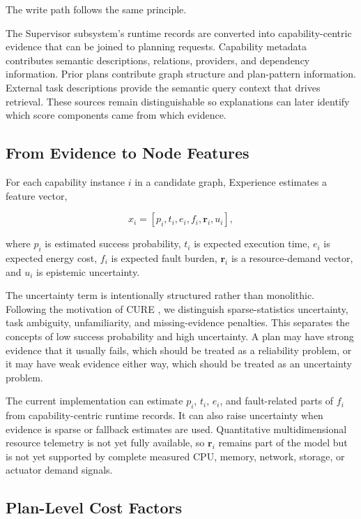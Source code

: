 \documentclass[letterpaper, 10pt, conference]{ieeeconf}
\begin{document}
The write path follows the same principle. 

The Supervisor subsystem's runtime records are converted into capability-centric evidence that can be joined to planning requests. Capability metadata contributes semantic descriptions, relations, providers, and dependency information. Prior plans contribute graph structure and plan-pattern information. External task descriptions provide the semantic query context that drives retrieval. These sources remain distinguishable so explanations can later identify which score components came from which evidence.

\subsection{From Evidence to Node Features}

For each capability instance $i$ in a candidate graph, Experience estimates a feature vector,

\begin{equation}
x_i = [p_i, t_i, e_i, f_i, \mathbf{r}_i, u_i],
\end{equation}

where $p_i$ is estimated success probability, $t_i$ is expected execution time, $e_i$ is expected energy cost, $f_i$ is expected fault burden, $\mathbf{r}_i$ is a resource-demand vector, and $u_i$ is epistemic uncertainty.

The uncertainty term is intentionally structured rather than monolithic. Following the motivation of CURE \cite{yin2025reliablellmbasedrobotplanning}, we distinguish sparse-statistics uncertainty, task ambiguity, unfamiliarity, and missing-evidence penalties. This separates the concepts of low success probability and high uncertainty. A plan may have strong evidence that it usually fails, which should be treated as a reliability problem, or it may have weak evidence either way, which should be treated as an uncertainty problem.

The current implementation can estimate $p_i$, $t_i$, $e_i$, and fault-related parts of $f_i$ from capability-centric runtime records. It can also raise uncertainty when evidence is sparse or fallback estimates are used. Quantitative multidimensional resource telemetry is not yet fully available, so $\mathbf{r}_i$ remains part of the model but is not yet supported by complete measured CPU, memory, network, storage, or actuator demand signals.

\subsection{Plan-Level Cost Factors}
\end{document}
